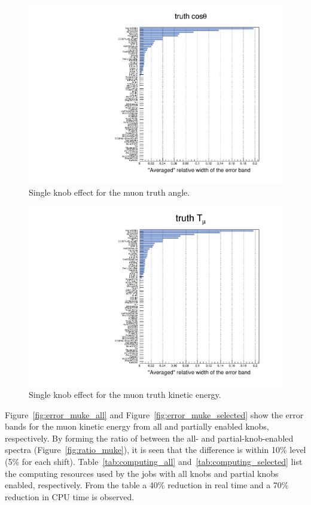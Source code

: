 \documentclass[12pt,a4paper,final]{iopart}
\begin{document}
\begin{figure}[h]
  \centering
  \includegraphics[width=\textwidth]{figures/t_cos.pdf}
  \caption{Single knob effect for the muon truth angle.}
  \label{fig:true_mu_ang}
\end{figure}

\begin{figure}[h]
  \centering
  \includegraphics[width=\textwidth]{figures/t_muke.pdf}
  \caption{Single knob effect for the muon truth kinetic energy.}
  \label{fig:true_mu_ke}
\end{figure}

Figure~\ref{fig:error_muke_all} and Figure~\ref{fig:error_muke_selected} show the error bands for the muon kinetic energy from all and partially enabled knobs, respectively. By forming the ratio of between the all- and partial-knob-enabled spectra (Figure~\ref{fig:ratio_muke}), it is seen that the difference is within 10\% level (5\% for each shift). Table~\ref{tab:computing_all} and~\ref{tab:computing_selected} list the computing resources used by the jobs with all knobs and partial knobs enabled, respectively. From the table a 40\% reduction in real time and a 70\% reduction in CPU time is observed.
\end{document}
